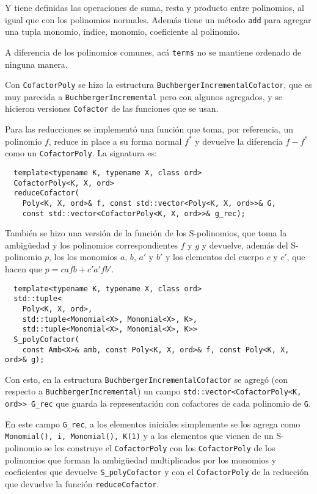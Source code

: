 \documentclass[12pt]{report}
\theoremstyle{customstyle}
\theoremstyle{factstyle}
\begin{document}
Y tiene definidas las operaciones de suma, resta y producto entre polinomios, al igual que con los polinomios normales. Además tiene un método \texttt{add} para agregar una tupla monomio, índice, monomio, coeficiente al polinomio.

A diferencia de los polinomios comunes, acá \texttt{terms} no se mantiene ordenado de ninguna manera.

Con \texttt{CofactorPoly} se hizo la estructura \texttt{BuchbergerIncrementalCofactor}, que es muy parecida a \texttt{BuchbergerIncremental} pero con algunos agregados, y se hicieron versiones \texttt{Cofactor} de las funciones que se usan.

Para las reducciones se implementó una función que toma, por referencia, un polinomio $f$, reduce in place a su forma normal $f^*$ y devuelve la diferencia $f - f^*$ como un \texttt{CofactorPoly}. La signatura es:

\begin{verbatim}
  template<typename K, typename X, class ord>
  CofactorPoly<K, X, ord>
  reduceCofactor(
    Poly<K, X, ord>& f, const std::vector<Poly<K, X, ord>>& G,
    const std::vector<CofactorPoly<K, X, ord>>& g_rec);
\end{verbatim}

También se hizo una versión de la función de los S-polinomios, que toma la ambigüedad y los polinomios correspondientes $f$ y $g$ y devuelve, además del S-polinomio $p$, los los monomios $a$, $b$, $a'$ y $b'$ y los elementos del cuerpo $c$ y $c'$, que hacen que $p = c a f b + c' a' f b'$.

\begin{verbatim}
  template<typename K, typename X, class ord>
  std::tuple<
    Poly<K, X, ord>,
    std::tuple<Monomial<X>, Monomial<X>, K>,
    std::tuple<Monomial<X>, Monomial<X>, K>>
  S_polyCofactor(
    const Amb<X>& amb, const Poly<K, X, ord>& f, const Poly<K, X, ord>& g);
\end{verbatim}

Con esto, en la estructura \texttt{BuchbergerIncrementalCofactor} se agregó (con respecto a \texttt{BuchbergerIncremental}) un campo \texttt{std::vector<CofactorPoly<K, ord>> G\_rec} que guarda la representación con cofactores de cada polinomio de \texttt{G}.

En este campo \texttt{G\_rec}, a los elementos iniciales simplemente se los agrega como \texttt{{Monomial(), i, Monomial(), K(1)}} y a los elementos que vienen de un S-polinomio se les construye el \texttt{CofactorPoly} con los \texttt{CofactorPoly} de los polinomios que forman la ambigüedad multiplicados por los monomios y coeficientes que devuelve \texttt{S\_polyCofactor} y con el \texttt{CofactorPoly} de la reducción que devuelve la función \texttt{reduceCofactor}.
\end{document}
